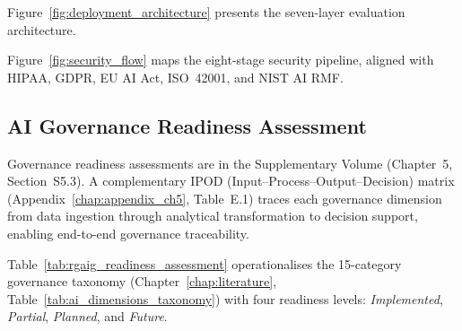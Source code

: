 
\noindent Figure~\ref{fig:deployment_architecture} presents the seven-layer evaluation architecture.



Figure~\ref{fig:security_flow} maps the eight-stage security pipeline, aligned with HIPAA, GDPR, EU AI Act, ISO~42001, and NIST AI RMF.



\subsection{AI Governance Readiness Assessment}

Governance readiness assessments are in the Supplementary Volume (Chapter~5, Section~S5.3). A complementary IPOD (Input--Process--Output--Decision) matrix (Appendix~\ref{chap:appendix_ch5}, Table~E.1) traces each governance dimension from data ingestion through analytical transformation to decision support, enabling end-to-end governance traceability.

\iffalse
Table~\ref{tab:rgaig_readiness_assessment} operationalises the 15-category governance taxonomy (Chapter~\ref{chap:literature}, Table~\ref{tab:ai_dimensions_taxonomy}) with four readiness levels: \textit{Implemented}, \textit{Partial}, \textit{Planned}, and \textit{Future}.

